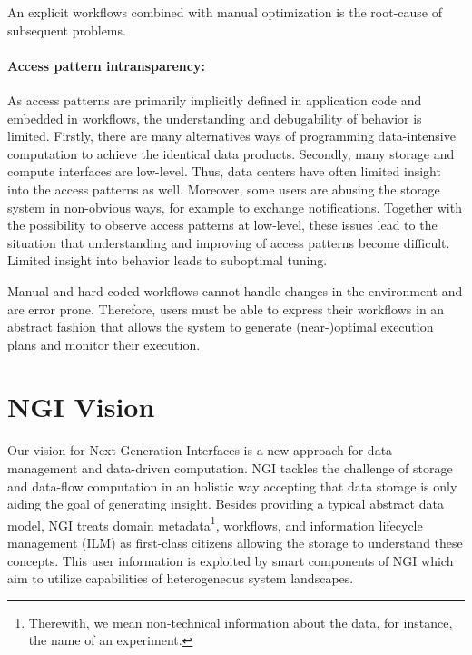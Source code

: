 \documentclass[a4paper, twocolumn]{article}
\begin{document}
An explicit workflows combined with manual optimization is the root-cause of subsequent problems.

\paragraph{Access pattern intransparency:}
As access patterns are primarily implicitly defined in application code and embedded in workflows, the understanding and debugability of behavior is limited.
Firstly, there are many alternatives ways of programming data-intensive computation to achieve the identical data products.
Secondly, many storage and compute interfaces are low-level.
Thus, data centers have often limited insight into the access patterns as well.
Moreover, some users are abusing the storage system in non-obvious ways, for example to exchange notifications.
Together with the possibility to observe access patterns at low-level, these issues lead to the situation that understanding and improving of access patterns become difficult.
Limited insight into behavior leads to suboptimal tuning.

Manual and hard-coded workflows cannot handle changes in the environment and are error prone.
Therefore, users must be able to express their workflows in an abstract fashion that allows the system to generate (near-)optimal execution plans and monitor their execution.


\section{NGI Vision}
\label{sec:ngiVision}

Our vision for Next Generation Interfaces is a new approach for data management and data-driven computation.
NGI tackles the challenge of storage and data-flow computation in an holistic way accepting that data storage is only aiding the goal of generating insight.
Besides providing a typical abstract data model, NGI treats domain metadata\footnote{Therewith, we mean non-technical information about the data, for instance, the name of an experiment.}, workflows, and information lifecycle management (ILM) as first-class citizens allowing the storage to understand these concepts.
This user information is exploited by smart components of NGI which aim to utilize capabilities of  heterogeneous system landscapes.
\end{document}
